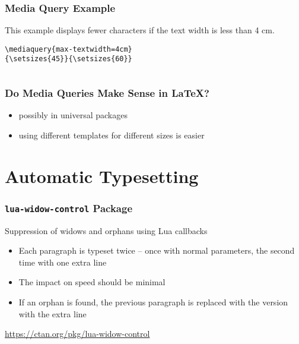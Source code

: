 \begin{frame}[fragile]

  \frametitle{Media Query Example}

  This example displays fewer characters if the text width is less than 4 cm.

\begin{verbatim}
\mediaquery{max-textwidth=4cm}
{\setsizes{45}}{\setsizes{60}}
\end{verbatim}
\begin{columns}
  \begin{column}{0.5\textwidth}

\end{column}
  \begin{column}{0.5\textwidth}

\end{column}
\end{columns}

\end{frame}

\begin{frame}
  \frametitle{Do Media Queries Make Sense in \LaTeX?}
  \begin{itemize}
    \item possibly in universal packages
    \item using different templates for different sizes is easier
  \end{itemize}
\end{frame}

\section{Automatic Typesetting}

\begin{frame}
  \frametitle{\texttt{lua-widow-control} Package}
  Suppression of widows and orphans using Lua callbacks
  \begin{itemize}
    \item Each paragraph is typeset twice -- once with normal parameters, the second time with one extra line
    \item The impact on speed should be minimal
    \item If an orphan is found, the previous paragraph is replaced with the version with the extra line
  \end{itemize}
  \url{https://ctan.org/pkg/lua-widow-control}
\end{frame}

